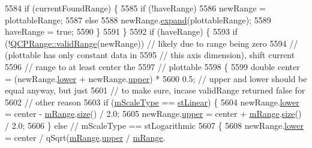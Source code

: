 \begin{DoxyCode}
5584     \textcolor{keywordflow}{if} (currentFoundRange) \{
5585       \textcolor{keywordflow}{if} (!haveRange)
5586         newRange = plottableRange;
5587       \textcolor{keywordflow}{else}
5588         newRange.\hyperlink{class_q_c_p_range_a0fa1bc8048be50d52bea93a8caf08305}{expand}(plottableRange);
5589       haveRange = \textcolor{keyword}{true};
5590     \}
5591   \}
5592   \textcolor{keywordflow}{if} (haveRange) \{
5593     \textcolor{keywordflow}{if} (!\hyperlink{class_q_c_p_range_ab38bd4841c77c7bb86c9eea0f142dcc0}{QCPRange::validRange}(newRange)) \textcolor{comment}{// likely due to range being zero}
5594                                          \textcolor{comment}{// (plottable has only constant data in}
5595                                          \textcolor{comment}{// this axis dimension), shift current}
5596                                          \textcolor{comment}{// range to at least center the}
5597                                          \textcolor{comment}{// plottable}
5598     \{
5599       \textcolor{keywordtype}{double} center = (newRange.\hyperlink{class_q_c_p_range_aa3aca3edb14f7ca0c85d912647b91745}{lower} + newRange.\hyperlink{class_q_c_p_range_ae44eb3aafe1d0e2ed34b499b6d2e074f}{upper}) *
5600                       0.5; \textcolor{comment}{// upper and lower should be equal anyway, but just}
5601                            \textcolor{comment}{// to make sure, incase validRange returned false for}
5602                            \textcolor{comment}{// other reason}
5603       \textcolor{keywordflow}{if} (\hyperlink{class_q_c_p_axis_ad706039549cbbbec5fcb2baf7894e04d}{mScaleType} == \hyperlink{class_q_c_p_axis_a36d8e8658dbaa179bf2aeb973db2d6f0aff6e30a11a828bc850caffab0ff994f6}{stLinear}) \{
5604         newRange.\hyperlink{class_q_c_p_range_aa3aca3edb14f7ca0c85d912647b91745}{lower} = center - \hyperlink{class_q_c_p_axis_a1ee36773c49062d751560e11f90845f7}{mRange}.\hyperlink{class_q_c_p_range_afa57c13049b965edb6fd1c00ac56338a}{size}() / 2.0;
5605         newRange.\hyperlink{class_q_c_p_range_ae44eb3aafe1d0e2ed34b499b6d2e074f}{upper} = center + \hyperlink{class_q_c_p_axis_a1ee36773c49062d751560e11f90845f7}{mRange}.\hyperlink{class_q_c_p_range_afa57c13049b965edb6fd1c00ac56338a}{size}() / 2.0;
5606       \} \textcolor{keywordflow}{else} \textcolor{comment}{// mScaleType == stLogarithmic}
5607       \{
5608         newRange.\hyperlink{class_q_c_p_range_aa3aca3edb14f7ca0c85d912647b91745}{lower} = center / qSqrt(\hyperlink{class_q_c_p_axis_a1ee36773c49062d751560e11f90845f7}{mRange}.\hyperlink{class_q_c_p_range_ae44eb3aafe1d0e2ed34b499b6d2e074f}{upper} / \hyperlink{class_q_c_p_axis_a1ee36773c49062d751560e11f90845f7}{mRange}.

\end{DoxyCode}

